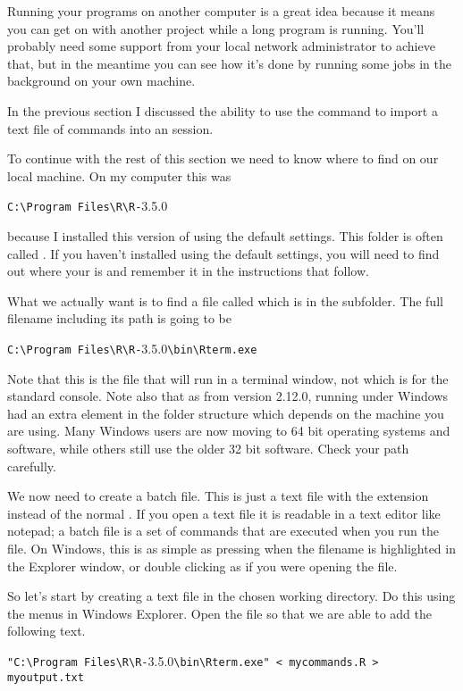 Running your \R{} programs on another computer is a great idea because it means you can get on with another project while a long program is running. You'll probably need some support from your local network administrator to achieve that, but in the meantime you can see how it's done by running some jobs in the background on your own machine. 
 
In the previous section I discussed the ability to use the  command to import a text file of commands into an \R{} session. 
 
To continue with the rest of this section we need to know where to find \R{} on our local machine. On my computer this was \begin{center} \verb+C:\Program Files\R\R-+3.5.0 
\end{center} 
 because I installed this version of \R{} using the default settings. This folder is often called \RHome{}. If you haven't installed \R{} using the default settings, you will need to find out where your \RHome{} is and remember it in the instructions that follow. 
 
What we actually want is to find a file called  which is in the  subfolder. The full filename including its path is going to be \begin{center}\verb+C:\Program Files\R\R-+3.5.0\verb+\bin\Rterm.exe+\end{center} Note that this is the file that will run \R{} in a terminal window, not  which is for the standard \R{} console. Note also that as from version 2.12.0, \R{} running under Windows had an extra element in the folder structure which depends on the machine you are using. Many Windows users are now moving to 64 bit operating systems and software, while others still use the older 32 bit software. Check your path carefully. 
 
We now need to create a batch file. This is just a text file with the extension  instead of the normal . If you open a text file it is readable in a text editor like notepad; a batch file is a set of commands that are executed when you run the file. On Windows, this is as simple as pressing  when the filename is highlighted in the Explorer window, or double clicking as if you were opening the file. 
 
So let's start by creating a text file in the chosen working directory. Do this using the menus in Windows Explorer. Open the file so that we are able to add the following text.  
\begin{center} 
\verb+"C:\Program Files\R\R-+3.5.0\verb+\bin\Rterm.exe" < mycommands.R > myoutput.txt+ 
\end{center} 
 
